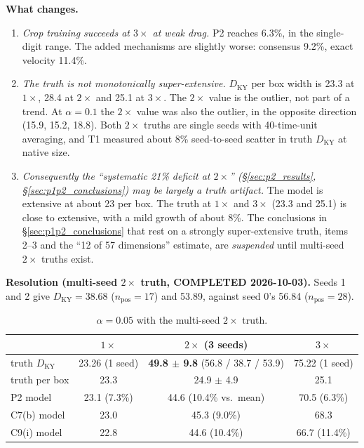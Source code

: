 \documentclass[11pt]{article}
\begin{document}
\textbf{What changes.}
\begin{enumerate}[leftmargin=*]
\item \emph{Crop training succeeds at $3\times$ at weak drag.} P2 reaches
  6.3\%, in the single-digit range. The added mechanisms are slightly
  worse: consensus 9.2\%, exact velocity 11.4\%.
\item \emph{The truth is not monotonically super-extensive.}
  $D_{\mathrm{KY}}$ per box width is 23.3 at $1\times$, 28.4 at $2\times$
  and 25.1 at $3\times$. The $2\times$ value is the outlier, not part of a
  trend. At $\alpha{=}0.1$ the $2\times$ value was also the outlier, in
  the opposite direction (15.9, 15.2, 18.8). Both $2\times$ truths are
  single seeds with 40-time-unit averaging, and T1 measured about 8\%
  seed-to-seed scatter in truth $D_{\mathrm{KY}}$ at native size.
\item \emph{Consequently the ``systematic 21\% deficit at $2\times$''
  (\S\ref{sec:p2_results}, \S\ref{sec:p1p2_conclusions}) may be largely a
  truth artifact.} The model is extensive at about 23 per box. The truth
  at $1\times$ and $3\times$ (23.3 and 25.1) is close to extensive, with a
  mild growth of about 8\%. The conclusions in
  \S\ref{sec:p1p2_conclusions} that rest on a strongly super-extensive
  truth, items 2--3 and the ``12 of 57 dimensions'' estimate, are
  \emph{suspended} until multi-seed $2\times$ truths exist.
\end{enumerate}

\textbf{Resolution (multi-seed $2\times$ truth, COMPLETED 2026-10-03).}
Seeds 1 and 2 give $D_{\mathrm{KY}}=38.68$ ($n_{\mathrm{pos}}{=}17$) and
53.89, against seed 0's 56.84 ($n_{\mathrm{pos}}{=}28$).

\begin{table}[h]
\centering
\small
\begin{tabular}{lccc}
\toprule
 & $1\times$ & $2\times$ (3 seeds) & $3\times$ \\
\midrule
truth $D_{\mathrm{KY}}$ & 23.26 (1 seed) & \textbf{49.8 $\pm$ 9.8} (56.8 / 38.7 / 53.9) & 75.22 (1 seed) \\
truth per box & 23.3 & 24.9 $\pm$ 4.9 & 25.1 \\
P2 model & 23.1 (7.3\%) & 44.6 (10.4\% vs.\ mean) & 70.5 (6.3\%) \\
C7(b) model & 23.0 & 45.3 (9.0\%) & 68.3 \\
C9(i) model & 22.8 & 44.6 (10.4\%) & 66.7 (11.4\%) \\
\bottomrule
\end{tabular}
\caption{$\alpha{=}0.05$ with the multi-seed $2\times$ truth.}
\label{tab:truth2_multiseed}
\end{table}
\end{document}
